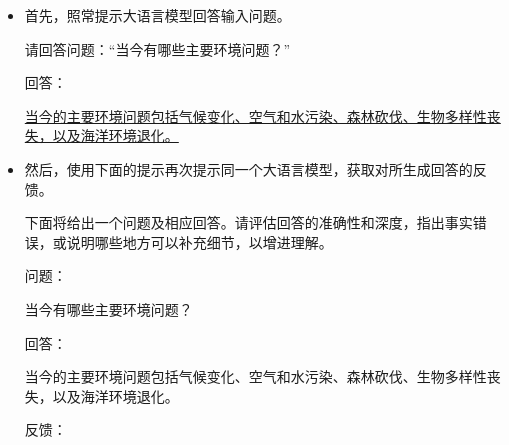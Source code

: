 \begin{itemize}
\item \vspace{0.5em} 首先，照常提示大语言模型回答输入问题。

\vspace{0.5em}
\begin{tcolorbox}

\begingroup
\setlength{\leftskip}{2em}
\setlength{\rightskip}{2em}

请回答问题：“当今有哪些主要环境问题？”

\vspace{0.5em}

回答：

\vspace{0.2em}

\uline{当今的主要环境问题包括气候变化、空气和水污染、森林砍伐、生物多样性丧失，以及海洋环境退化。}

\endgroup

\end{tcolorbox}
\vspace{0.5em}

\item 然后，使用下面的提示再次提示同一个大语言模型，获取对所生成回答的反馈。

\vspace{0.5em}
\begin{tcolorbox}

\begingroup
\setlength{\leftskip}{2em}
\setlength{\rightskip}{2em}

下面将给出一个问题及相应回答。请评估回答的准确性和深度，指出事实错误，或说明哪些地方可以补充细节，以增进理解。

\vspace{0.5em}

问题：

\vspace{0.2em}

当今有哪些主要环境问题？

\vspace{0.5em}

回答：

\vspace{0.2em}

当今的主要环境问题包括气候变化、空气和水污染、森林砍伐、生物多样性丧失，以及海洋环境退化。

\vspace{0.5em}

反馈：

\vspace{0.2em}


\end{tcolorbox}
\end{itemize}
